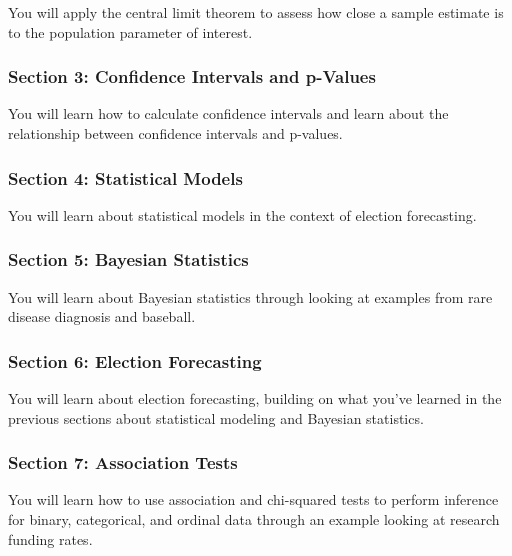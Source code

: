 \documentclass[
]{article}
\begin{document}
You will apply the central limit theorem to assess how close a sample
estimate is to the population parameter of interest.

\hypertarget{section-3-confidence-intervals-and-p-values}{%
\subsubsection{Section 3: Confidence Intervals and
p-Values}\label{section-3-confidence-intervals-and-p-values}}

You will learn how to calculate confidence intervals and learn about the
relationship between confidence intervals and p-values.

\hypertarget{section-4-statistical-models}{%
\subsubsection{Section 4: Statistical
Models}\label{section-4-statistical-models}}

You will learn about statistical models in the context of election
forecasting.

\hypertarget{section-5-bayesian-statistics}{%
\subsubsection{Section 5: Bayesian
Statistics}\label{section-5-bayesian-statistics}}

You will learn about Bayesian statistics through looking at examples
from rare disease diagnosis and baseball.

\hypertarget{section-6-election-forecasting}{%
\subsubsection{Section 6: Election
Forecasting}\label{section-6-election-forecasting}}

You will learn about election forecasting, building on what you've
learned in the previous sections about statistical modeling and Bayesian
statistics.

\hypertarget{section-7-association-tests}{%
\subsubsection{Section 7: Association
Tests}\label{section-7-association-tests}}

You will learn how to use association and chi-squared tests to perform
inference for binary, categorical, and ordinal data through an example
looking at research funding rates.
\end{document}
